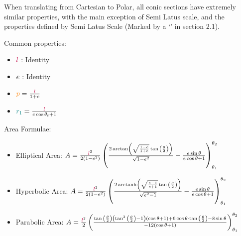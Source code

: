 When translating from Cartesian to Polar, all conic sections have extremely similar properties, with the main exception of Semi Latus scale, and the properties defined by Semi Latus Scale (Marked by a `\aster' in section 2.1).

\bigskip
\noindent
Common properties:
\begin{itemize}
    \item $\textcolor{purple}{l}$ : Identity
    \item $\textcolor{black}{e}$ : Identity
    \item $\textcolor{orange}{p} = \frac{\textcolor{purple}{l}}{1+\textcolor{black}{e}}$
    \item $\textcolor{teal}{r_1} = \frac{\textcolor{purple}{l}}{\textcolor{black}{e}\cos{\textcolor{black}{\theta_t}} + 1}$
\end{itemize}
\bigskip
Area Formulae:
\begin{itemize}
    \item Elliptical Area: $A=\frac{\textcolor{purple}{l}^2}{2(1-\textcolor{black}{e}^2)} \left(
\frac{2\arctan\left(\sqrt{\frac{1-\textcolor{black}{e}}{1+\textcolor{black}{e}}}\tan{\left(\frac{\theta}{2}\right)}\right)}{\sqrt{1-\textcolor{black}{e}^2}}
-\frac{\textcolor{black}{e}\sin{\theta}}{\textcolor{black}{e}\cos{\theta}+1}\right)_{\theta_1}^{\theta_2}$
    \item Hyperbolic Area: $A=\frac{\textcolor{purple}{l}^2}{2(1-\textcolor{black}{e}^2)} \left(
\frac{2\operatorname{arctanh}\left(\sqrt{\frac{\textcolor{black}{e}-1}{\textcolor{black}{e}+1}}\tan{\left(\frac{\theta}{2}\right)}\right)}{\sqrt{\textcolor{black}{e}^2-1}}
-\frac{\textcolor{black}{e}\sin{\theta}}{\textcolor{black}{e}\cos{\theta}+1}\right)_{\theta_1}^{\theta_2}$
    \item Parabolic Area: $A=\frac{\textcolor{purple}{l}^2}{2}\left(
\frac{\tan{\left(\frac{\theta}{2}\right)}\left(\tan^2{\left(\frac{\theta}{2}\right)}-1\right)(\cos{\theta}+1)
+6\cos{\theta}\cdot\tan{\left(\frac{\theta}{2}\right)}
-8\sin{\theta}}
{-12(\cos{\theta}+1)}
\right)_{\theta_1}^{\theta_2}$
\end{itemize}
